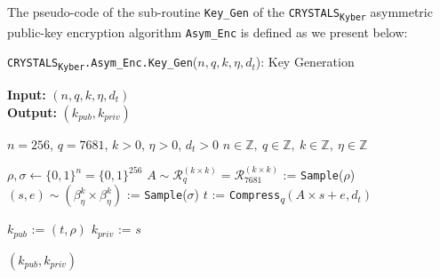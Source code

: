 \documentclass[runningheads]{llncs}
\numberwithin{equation}{section}
\begin{document}
    \noindent The pseudo-code of the sub-routine \texttt{Key\_Gen} of the \texorpdfstring{\texttt{CRYSTALS}\textsubscript{\texttt{Kyber}}}\/ asymmetric public-key encryption algorithm \texttt{Asym\_Enc} is defined as we present below:
    \vspace{-3.75ex}
    \setcounter{algorithm}{2}
    \begin{algorithm}
        \caption{\texorpdfstring{\texttt{CRYSTALS}\textsubscript{\texttt{Kyber}}\texttt{.Asym\_Enc}\texttt{.Key\_Gen}($n,q,k,\eta,{d}_{t}$)}\/: Key Generation}
        \label{subrou:crystals-kyber-asymmetric-encryption-key-gen}
        
        \textbf{Input:} $\left( n, q, k, \eta, {d}_{t} \right)$\\
        \textbf{Output:} $\left( {k}_{pub}, {k}_{priv} \right)$
        
        \begin{algorithmic}[1]
            \Require $n = 256$, $q = 7681$\footnotemark, $k > 0$, $\eta > 0$, ${d}_{t} > 0$
            \Ensure $n \in \mathbb{Z},\ q \in \mathbb{Z},\ k \in \mathbb{Z},\ \eta \in \mathbb{Z}$
        
            \vspace{2ex}
            
            \State $\rho, \sigma \gets { \{ 0 , 1 \} }^{n} = { \{ 0 , 1 \} }^{256}$
            \State $A \sim {\mathcal{R}}_{q}^{( k \times k )} = {\mathcal{R}}_{7681}^{( k \times k )}$ := \texttt{Sample}($\rho$)
            \State $(s, e) \sim \left( {\beta}_{\eta}^{k} \times {\beta}_{\eta}^{k} \right)$ := \texttt{Sample}($\sigma$)
            \State $t$ := \texttt{Compress}\textsubscript{$q$}$\left( A \times s + e, {d}_{t} \right)$
            
            \vspace{1ex}
            
            \State ${k}_{pub}$ := $(t, \rho)$
            \State ${k}_{priv}$ := $s$
            
            \vspace{1ex}
            
            \State \Return $\left( {k}_{pub}, {k}_{priv} \right)$
        \end{algorithmic}
    \end{algorithm}
    \vspace{-3ex}

    
\end{document}
